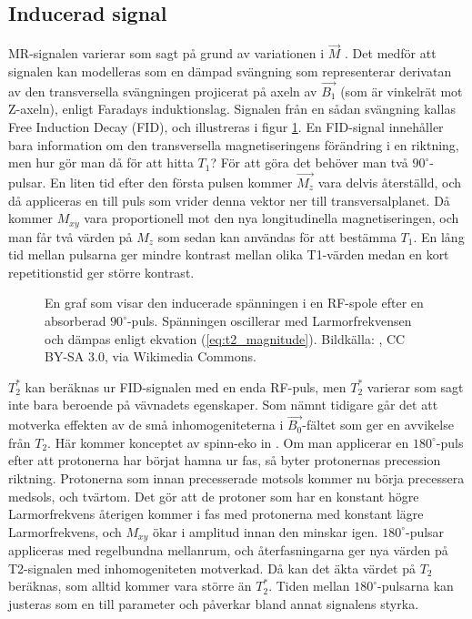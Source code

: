 \documentclass[11pt, a4paper]{article}
\begin{document}
\subsection{Inducerad signal}
MR-signalen varierar som sagt på grund av variationen i $\vec{M}$ \parencite{understanding_mri}. Det medför att signalen kan modelleras som en dämpad svängning som representerar derivatan av den transversella svängningen projicerat på axeln av $\vec{B_1}$ (som är vinkelrät mot Z-axeln), enligt Faradays induktionslag. Signalen från en sådan svängning kallas Free Induction Decay (FID), och illustreras i figur \ref{fig:fid}. En FID-signal innehåller bara information om den transversella magnetiseringens förändring i en riktning, men hur gör man då för att hitta $T_1$? För att göra det behöver man två $90^\circ$-pulsar. En liten tid efter den första pulsen kommer $\vec{M_z}$ vara delvis återställd, och då appliceras en till puls som vrider denna vektor ner till transversalplanet. Då kommer $M_{xy}$ vara proportionell mot den nya longitudinella magnetiseringen, och man får två värden på $M_z$ som sedan kan användas för att bestämma $T_1$. En lång tid mellan pulsarna ger mindre kontrast mellan olika T1-värden medan en kort repetitionstid ger större kontrast.

\begin{figure}[ht]
	\centering
	
	\caption{En graf som visar den inducerade spänningen i en RF-spole efter en absorberad $90^\circ$-puls. Spänningen oscillerar med Larmorfrekvensen och dämpas enligt ekvation (\ref{eq:t2_magnitude}). Bildkälla: \textcite{fig:fid}, CC BY-SA 3.0, via Wikimedia Commons.}
	\label{fig:fid}
\end{figure}

$T^*_2$ kan beräknas ur FID-signalen med en enda RF-puls, men $T^*_2$ varierar som sagt inte bara beroende på vävnadets egenskaper. Som nämnt tidigare går det att motverka effekten av de små inhomogeniteterna i $\vec{B_0}$-fältet som ger en avvikelse från $T_2$. Här kommer konceptet av spinn-eko in \parencite{understanding_mri}. Om man applicerar en $180^\circ$-puls efter att protonerna har börjat hamna ur fas, så byter protonernas precession riktning. Protonerna som innan precesserade motsols kommer nu börja precessera medsols, och tvärtom. Det gör att de protoner som har en konstant högre Larmorfrekvens återigen kommer i fas med protonerna med konstant lägre Larmorfrekvens, och $M_{xy}$ ökar i amplitud innan den minskar igen. $180^\circ$-pulsar appliceras med regelbundna mellanrum, och återfasningarna ger nya värden på T2-signalen med inhomogeniteten motverkad. Då kan det äkta värdet på $T_2$ beräknas, som alltid kommer vara större än $T^*_2$. Tiden mellan $180^\circ$-pulsarna kan justeras som en till parameter och påverkar bland annat signalens styrka.
\end{document}
